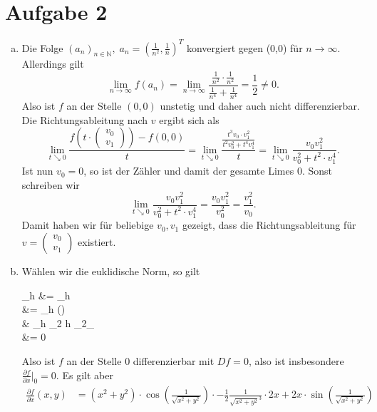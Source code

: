 \documentclass{article}
\theoremstyle{definition}
\newcommand{\N}{\mathbb{N}}
\newcommand{\norm}[1]{\left\Vert #1 \right\Vert}
\newcommand{\pdv}[2]{\frac{\partial #1}{\partial #2}}
\let\oldstackrel\stackrel
\renewcommand{\stackrel}[2]{%
    \oldstackrel{\mathclap{#1}}{#2}
}%
\begin{document}
\section*{Aufgabe 2}
\begin{enumerate}[(a)]
	\item Die Folge $\left(a_n\right)_{n\in \N},\; a_n = \left(\frac{1}{n^2}, \frac{1}{n}\right)^T$ konvergiert gegen (0,0) für $n \to \infty$. Allerdings gilt \[\lim\limits_{n\to \infty} f(a_n) = \lim\limits_{n\to \infty} \frac{\frac{1}{n^2}\cdot \frac{1}{n^2}}{\frac{1}{n^4} + \frac{1}{n^4}} = \frac{1}{2} \neq 0.\] Also ist $f$ an der Stelle $(0,0)$ unstetig und daher auch nicht differenzierbar. Die Richtungsableitung nach $v$ ergibt sich als \[\lim\limits_{t\searrow 0} \frac{f\left(t \cdot \begin{pmatrix}
		v_0\\v_1
	\end{pmatrix}\right)-f(0,0)}{t} = \lim\limits_{t\searrow 0} \frac{\frac{t^3 v_0 \cdot v_1^2}{t^2v_0^2 + t^4v_1^4}}{t} = \lim\limits_{t\searrow 0} \frac{v_0v_1^2}{v_0^2 + t^2\cdot v_1^4}.\]
	Ist nun $v_0 = 0$, so ist der Zähler und damit der gesamte Limes $0$. Sonst schreiben wir \[\lim\limits_{t\searrow 0} \frac{v_0v_1^2}{v_0^2 + t^2\cdot v_1^4} = \frac{v_0v_1^2}{v_0^2} = \frac{v_1^2}{v_0}.\]
	Damit haben wir für beliebige $v_0, v_1$ gezeigt, dass die Richtungsableitung für $v = \begin{pmatrix}
		v_0\\v_1
	\end{pmatrix}$ existiert.
	\item Wählen wir die euklidische Norm, so gilt
	\begin{salign*}
		\lim\limits_{h} \frac{f(h)-f(0)}{\norm{h}_2} 
		&= \lim\limits_{h} \\
		&= \lim\limits_{h} \sin\left(\right)\\
		&\stackrel{h \to 0 \implies \norm{h}_2 \to 0}{=} \lim\limits_{\norm{h}_2} \norm{h}_2\underbrace{\sin\left(\frac{1}{\norm{h}_2}\right)}_{}\\
		&= 0
	\end{salign*}
	Also ist $f$ an der Stelle $0$ differenzierbar mit $Df = 0$, also ist insbesondere $\pdv{f}{x}\big|_0 = 0$. Es gilt aber 
	\begin{align*}
		\pdv{f}{x}(x,y) &= (x^2 + y^2) \cdot \cos\left(\frac{1}{\sqrt{x^2 + y^2}}\right) \cdot - \frac{1}{2} \frac{1}{\sqrt{x^2 + y^2}^3} \cdot 2x + 2x \cdot \sin\left(\frac{1}{\sqrt{x^2 + y^2}}\right)\\

\end{align*}
\end{enumerate}
\end{document}
